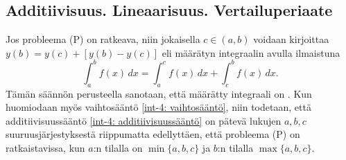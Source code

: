 \subsection*{Additiivisuus. Lineaarisuus. Vertailuperiaate}

Jos probleema (P) on ratkeava, niin jokaisella $c\in(a,b)$ voidaan kirjoittaa
$y(b)=y(c)+[y(b)-y(c)]$ eli määrätyn integraalin avulla ilmaistuna
%
\begin{equation} \label{int-4: additiivisuussääntö}
\boxed{\quad \int_a^b f(x)\,dx = \int_a^c f(x)\,dx + \int_c^b f(x)\,dx. \quad}
\end{equation}
Tämän säännön perusteella sanotaan, että määrätty integraali on 
. Kun huomiodaan myös vaihtosääntö \eqref{int-4: vaihtosääntö},
niin todetaan, että additiivisuussääntö \eqref{int-4: additiivisuussääntö} on pätevä lukujen
$a,b,c$ suuruusjärjestyksestä riippumatta edellyttäen, että probleema (P) on ratkaistavissa,
kun $a$:n tilalla on $\min\{a,b,c\}$ ja $b$:n tilalla $\max\{a,b,c\}$.

